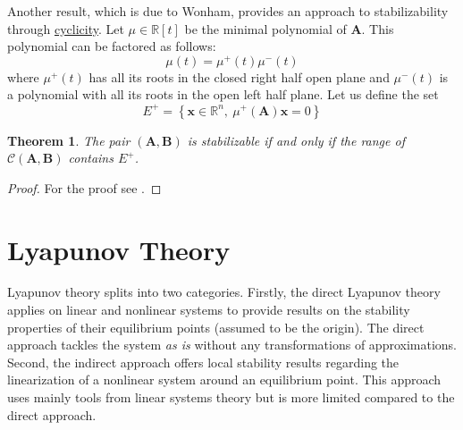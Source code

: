 \documentclass[a4paper,10pt,oneside]{book}
\newtheorem{theorem}{Theorem}
\begin{document}
\noindent Another result, which is due to Wonham, provides an approach to stabilizability through \hyperlink{def:cyclicMatrix}{cyclicity}. Let $\mu\in\mathbb{R}[t]$ be the minimal polynomial of $\mathbf{A}$. This polynomial can be factored as follows:
\begin{equation}
 \mu(t)=\mu^+(t)\mu^-(t)
\end{equation}
where $\mu^+(t)$ has all its roots in the closed right half open plane and $\mu^-(t)$
is a polynomial with all its roots in the open left half plane. Let us define the set
\begin{equation}
 E^+ = \left\{ \mathbf{x}\in\mathbb{R}^n,\ \mu^+(\mathbf{A})\mathbf{x}=0\right\}
\end{equation}
\begin{theorem}
 The pair $(\mathbf{A},\mathbf{B})$ is stabilizable if and only if the range of $\mathcal{C}(\mathbf{A},\mathbf{B})$
contains $E^+$.
\end{theorem}
\begin{proof}
 For the proof see \cite{Won67}.
\end{proof}


%
%
%
%
%
\section{Lyapunov Theory}
%
%
Lyapunov theory splits into two categories. Firstly, the direct Lyapunov theory applies on linear and nonlinear systems to provide results on the stability properties of their equilibrium points (assumed to be the origin). The direct approach tackles the system \emph{as is} without any transformations of approximations. Second, the indirect approach offers local stability results regarding the linearization of a nonlinear system around an equilibrium point. This approach uses mainly tools from linear systems theory but is more limited compared to the direct approach.
%
%
\end{document}
